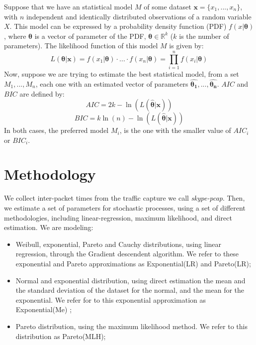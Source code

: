 Suppose that we have an statistical model $M$ of some dataset ${\boldsymbol{x} = \{x_1, ..., x_n}\}$, with $n$ independent and identically distributed observations of a random variable $X$. This model can be expressed by a probability density function (PDF) $f(x| \boldsymbol{\theta})$, where $\boldsymbol{\theta}$ is a vector of parameter of the PDF, $\boldsymbol{\theta} \in \mathbb{R}^{k}$ ($k$ is the number of parameters). The  likelihood function  of this model $M$ is given by:
\begin{equation}
L(\boldsymbol{\theta}|\boldsymbol{x} ) =  f(x_1|\boldsymbol{\theta})\cdot...\cdot f(x_n|\boldsymbol{\theta}) = \prod_{i = 1}^{n}f(x_i|\boldsymbol{\theta})
\end{equation}
Now, suppose we are trying to estimate the best statistical model, from a set ${M_1, ..., M_n}$, each one with an estimated vector of parameters  ${\boldsymbol{\hat{\theta_1}}}, ..., {\boldsymbol{\hat{\theta_n}}}$. $AIC$ and $BIC$ are defined by:
\begin{equation}
AIC = 2k - \ln(L(\boldsymbol{\hat{\theta}}|\boldsymbol{x}))
\end{equation}
\begin{equation}
BIC = k\ln(n) - \ln(L(\boldsymbol{\hat{\theta}}|\boldsymbol{x}))
\end{equation}
In both cases, the preferred model $M_i$, is the one with the smaller value of $AIC_i$ or $BIC_i$.

\section{Methodology}

We collect inter-packet times from the traffic capture we call \textit{skype-pcap}. Then, we estimate a set of parameters for stochastic processes, using a set of different methodologies, including linear-regression, maximum likelihood, and direct estimation. We are modeling: 

\begin{itemize}
 \item Weibull, exponential, Pareto and Cauchy distributions, using linear regression, through the Gradient descendent algorithm. We refer to these exponential and Pareto approximations as Exponential(LR) and Pareto(LR);
    \item Normal and exponential distribution, using direct estimation the mean and the standard deviation of the dataset for the normal, and the mean for the exponential. We refer for to this exponential approximation as Exponential(Me) ;
    \item Pareto distribution, using the maximum likelihood method. We refer to this distribution as Pareto(MLH);
\end{itemize}

